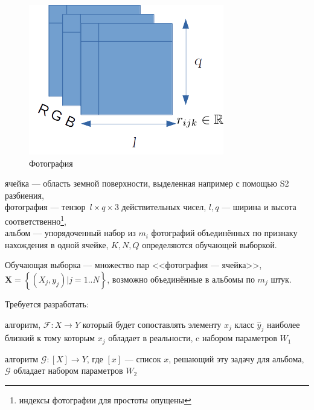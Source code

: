 \begin{figure}
	\begin{center}
	\includegraphics[width=0.9\linewidth]{img/photo}
	\end{center}
	\caption{Фотография}
	\label{fig:photo}
\end{figure}
ячейка --- область земной поверхности, выделенная например с помощью S2 разбиения,\\
фотография --- тензор\, $ l \times q \times 3$  действительных чисел, $ l, q $ --- ширина 
и высота соответственно\footnote{индексы фотографии для простоты опущены},\\
альбом --- упорядоченный набор из $ m_i $ фотографий объединённых по признаку нахождения в одной ячейке, 
$ K, N, Q $ определяются обучающей выборкой.

Обучающая выборка --- множество пар <<фотография --- ячейка>>, $\mathbf{X} = \left\{(X_j, y_j)|j = 1 .. N \right\} $, возможно объединённые в альбомы по $ m_j $ штук.

Требуется разработать:
\begin{compactitem}

\item алгоритм, $ \mathcal{F}: X \to Y $
который будет сопоставлять элементу $ x_j $ класс $ \hat{y}_j $ наиболее близкий к тому которым $ x_j $ обладает в реальности, c набором параметров $ W_1 $
\item алгоритм $ \mathcal{G}: [X] \to Y $, где $ [x] $ --- список $ x $, решающий эту задачу для альбома,  $ \mathcal{G}$ обладает набором параметров $ W_2 $

\end{compactitem}

